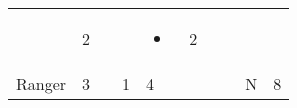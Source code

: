 \documentclass[12pt]{article}
\begin{document}
\begin{longtable}[]{@{}llllllllll@{}}
\begin{minipage}[t]{0.06\columnwidth}
\strut\end{minipage} &
\begin{minipage}[t]{0.06\columnwidth}\raggedright\strut
2
\strut\end{minipage} &
\begin{minipage}[t]{0.06\columnwidth}\raggedright\strut
\strut\end{minipage} &
\begin{minipage}[t]{0.06\columnwidth}\raggedright\strut
\strut\end{minipage} &
\begin{minipage}[t]{0.07\columnwidth}\raggedright\strut
\begin{itemize}
\item
\end{itemize}
\strut\end{minipage} &
\begin{minipage}[t]{0.08\columnwidth}\raggedright\strut
2
\strut\end{minipage}\tabularnewline
\begin{minipage}[t]{0.13\columnwidth}\raggedright\strut
Ranger
\strut\end{minipage} &
\begin{minipage}[t]{0.06\columnwidth}\raggedright\strut
3
\strut\end{minipage} &
\begin{minipage}[t]{0.06\columnwidth}\raggedright\strut
\strut\end{minipage} &
\begin{minipage}[t]{0.06\columnwidth}\raggedright\strut
1
\strut\end{minipage} &
\begin{minipage}[t]{0.06\columnwidth}\raggedright\strut
4
\strut\end{minipage} &
\begin{minipage}[t]{0.06\columnwidth}\raggedright\strut
\strut\end{minipage} &
\begin{minipage}[t]{0.06\columnwidth}\raggedright\strut
\strut\end{minipage} &
\begin{minipage}[t]{0.06\columnwidth}\raggedright\strut
\strut\end{minipage} &
\begin{minipage}[t]{0.07\columnwidth}\raggedright\strut
N
\strut\end{minipage} &
\begin{minipage}[t]{0.08\columnwidth}\raggedright\strut
8
\strut\end{minipage}\tabularnewline

\end{longtable}
\end{document}
